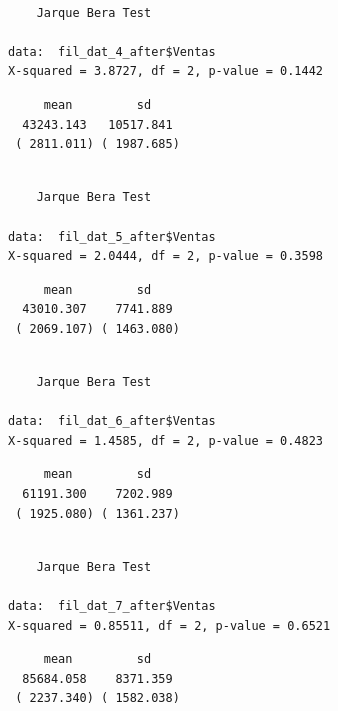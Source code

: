 \documentclass[
  us-letterpaper,
]{scrreprt}
\newenvironment{Shaded}{\begin{snugshade}}{\end{snugshade}}
\newcommand{\CommentTok}[1]{\textcolor[rgb]{0.37,0.37,0.37}{#1}}
\newcommand{\FunctionTok}[1]{\textcolor[rgb]{0.28,0.35,0.67}{#1}}
\newcommand{\NormalTok}[1]{\textcolor[rgb]{0.00,0.23,0.31}{#1}}
\newcommand{\SpecialCharTok}[1]{\textcolor[rgb]{0.37,0.37,0.37}{#1}}
\theoremstyle{plain}
\theoremstyle{plain}
\theoremstyle{definition}
\theoremstyle{remark}
\begin{document}
\begin{verbatim}

    Jarque Bera Test

data:  fil_dat_4_after$Ventas
X-squared = 3.8727, df = 2, p-value = 0.1442
\end{verbatim}

\begin{verbatim}
     mean         sd    
  43243.143   10517.841 
 ( 2811.011) ( 1987.685)
\end{verbatim}

\begin{verbatim}

    Jarque Bera Test

data:  fil_dat_5_after$Ventas
X-squared = 2.0444, df = 2, p-value = 0.3598
\end{verbatim}

\begin{verbatim}
     mean         sd    
  43010.307    7741.889 
 ( 2069.107) ( 1463.080)
\end{verbatim}

\begin{verbatim}

    Jarque Bera Test

data:  fil_dat_6_after$Ventas
X-squared = 1.4585, df = 2, p-value = 0.4823
\end{verbatim}

\begin{verbatim}
     mean         sd    
  61191.300    7202.989 
 ( 1925.080) ( 1361.237)
\end{verbatim}

\begin{verbatim}

    Jarque Bera Test

data:  fil_dat_7_after$Ventas
X-squared = 0.85511, df = 2, p-value = 0.6521
\end{verbatim}

\begin{verbatim}
     mean         sd    
  85684.058    8371.359 
 ( 2237.340) ( 1582.038)
\end{verbatim}

\begin{Shaded}
\end{Shaded}
\end{document}
